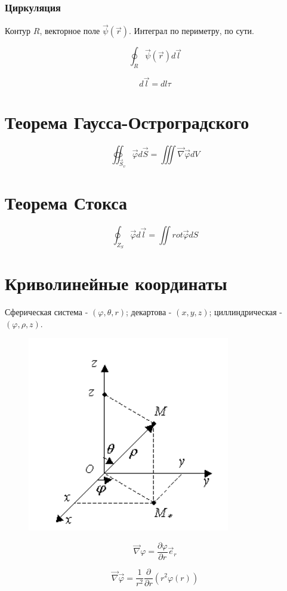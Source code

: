 \documentclass{article}
\begin{document}
\subsubsection{Циркуляция}

Контур $R$, векторное поле $\vec \psi(\vec r)$. Интеграл по периметру, по сути.

$$\oint_{R} \vec \psi(\vec r)d\vec{l}$$

$$d\vec{l} = dl\tau$$

\section{Теорема Гаусса-Остроградского}

$$\oiint_{\vec S_v}\vec \varphi d\vec S = \iiint \vec \nabla \vec \varphi dV$$

\section{Теорема Стокса}

$$\oint_{Z_S} \vec\varphi d\vec l = \iint rot \vec\varphi dS$$

\section{Криволинейные координаты}
Сферическая система - $(\varphi,\theta, r)$; декартова - $(x,y,z)$; циллиндрическая - $(\varphi, \rho, z)$.
\begin{figure}[htp]
\centering
\includegraphics[scale=.600]{coords.png}
\end{figure}

$$\vec \nabla \varphi = \frac{\partial \varphi}{\partial r}\vec e_r$$

$$\vec \nabla \vec \varphi = \frac1{r^2}\frac{\partial}{\partial r}(r^2\varphi(r))$$
\end{document}
